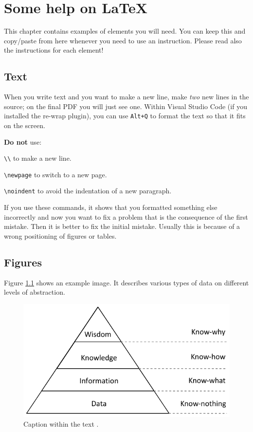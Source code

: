 \chapter{Some help on \LaTeX}

This chapter contains examples of elements you will need. You can keep this and
copy/paste from here whenever you need to use an instruction. Please read also
the instructions for each element!

\section{Text}

When you write text and you want to make a new line, make \textit{two} new lines
in the source; on the final PDF you will just see one. Within Visual Studio Code
(if you installed the re-wrap plugin), you can use \texttt{Alt+Q} to format the
text so that it fits on the screen. 

\textbf{Do not} use:

\begin{tight_enumerate}
  \item \texttt{\textbackslash\textbackslash} to make a new line.
  \item \texttt{\textbackslash newpage} to switch to a new page.
  \item \texttt{\textbackslash noindent} to avoid the indentation of a new
  paragraph.
\end{tight_enumerate}

If you use these commands, it shows that you formatted something else
incorrectly and now you want to fix a problem that is the consequence of the
first mistake. Then it is better to fix the initial mistake. Usually this is
because of a wrong positioning of figures or tables.

\section{Figures}

Figure \ref{fig:example} shows an example image. It describes various types of
data on different levels of abstraction.

\begin{figure}[ht]
	\centering
	\includegraphics[scale=0.9]{img/example.pdf}
	\caption[Caption for the index]{Caption within the text \cite{Lauesen2002}.}
	\label{fig:example}
\end{figure}

